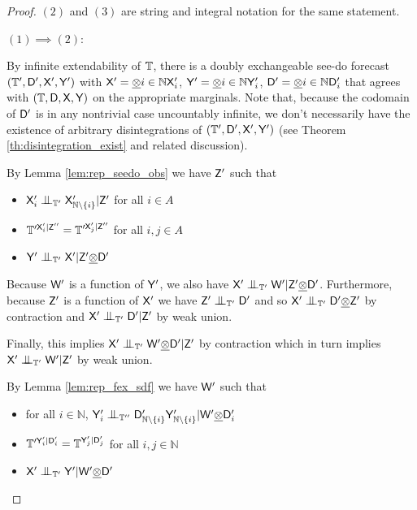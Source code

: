 \begin{proof}
$(2)$ and $(3)$ are string and integral notation for the same statement. 

$(1)\implies (2)$:

By infinite extendability of $\mathbb{T}$, there is a doubly exchangeable see-do forecast $(\mathbb{T}',\mathsf{D}',\mathsf{X}',\mathsf{Y}')$ with $\mathsf{X}'=\underline{\otimes}{i\in\mathbb{N}}\mathsf{X}'_i$, $\mathsf{Y}'=\underline{\otimes}{i\in\mathbb{N}}\mathsf{Y}'_i$, $\mathsf{D}'=\underline{\otimes}{i\in\mathbb{N}}\mathsf{D}'_i$ that agrees with $(\mathbb{T},\mathsf{D},\mathsf{X},\mathsf{Y})$ on the appropriate marginals. Note that, because the codomain of $\mathsf{D}'$ is in any nontrivial case uncountably infinite, we don't necessarily have the existence of arbitrary disintegrations of $(\mathbb{T}',\mathsf{D}',\mathsf{X}',\mathsf{Y}')$ (see Theorem \ref{th:disintegration_exist} and related discussion).

By Lemma \ref{lem:rep_seedo_obs} we have $\mathsf{Z}'$ such that 
\begin{itemize}
    \item $\RV{X}'_i\CI_{\kernel{T}'}\RV{X}'_{\mathbb{N}\setminus\{i\}}|\RV{Z}'$ for all $i\in A$
    \item $\mathbb{T}^{\prime \mathsf{X}'_i|\mathsf{Z}''}=\mathbb{T}^{\prime \mathsf{X}'_j|\mathsf{Z}''}$ for all $i,j\in A$
    \item $\RV{Y}'\CI_{\kernel{T}'}\RV{X}'|\RV{Z}'\utimes \RV{D}'$
\end{itemize}

Because $\mathsf{W}'$ is a function of $\mathsf{Y}'$, we also have $\RV{X}'\CI_{\kernel{T}'} \RV{W}'|\RV{Z}'\utimes\RV{D}'$. Furthermore, because $\mathsf{Z}'$ is a function of $\mathsf{X}'$ we have $\RV{Z}'\CI_{\kernel{T}'} \RV{D}'$ and so $\RV{X}'\CI_{\kernel{T}'}\RV{D}'\utimes\RV{Z}'$ by contraction and $\RV{X}'\CI_{\kernel{T}'}\RV{D}'|\RV{Z}'$ by weak union. 

Finally, this implies $\RV{X}'\CI_{\kernel{T}'} \RV{W}'\utimes\RV{D}'|\RV{Z}'$ by contraction which in turn implies $\RV{X}'\CI_{\kernel{T}'}\RV{W}'|\RV{Z}'$ by weak union.

By Lemma \ref{lem:rep_fex_sdf} we have $\mathsf{W}'$ such that

\begin{itemize}
    \item for all $i\in \mathbb{N}$, $\RV{Y}'_i\CI_{\kernel{T}''}\RV{D}'_{\mathbb{N}\setminus\{i\}}\RV{Y}'_{\mathbb{N}\setminus \{i\}}|\RV{W}'\utimes \RV{D}'_i$
    \item $\mathbb{T}^{\prime \mathsf{Y}'_i|\mathsf{D}'_i}=\mathbb{T}^{\mathsf{Y}'_j|\mathsf{D}'_j}$ for all $i,j\in \mathbb{N}$ 
    \item $\RV{X}'\CI_{\kernel{T}'}\RV{Y}'|\RV{W}'\utimes \RV{D}'$
\end{itemize}


\end{proof}
